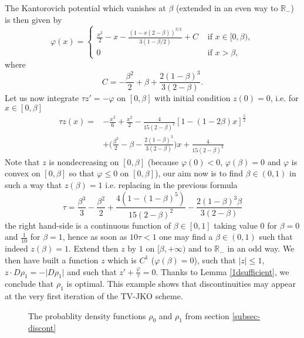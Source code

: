 \documentclass[12pt, a4paper]{article}
\numberwithin{equation}{section}
\theoremstyle{plain}
\theoremstyle{definition}
\theoremstyle{remark}
\newcommand{\R}{\mathbb{R}}
\begin{document}
The Kantorovich potential which vanishes at $\beta$ (extended in an even way to $\R_-$) is then given by
\[\varphi(x) = \begin{cases}
\frac{x^2}{2}- x -\frac{(1-x(2-\beta))^{3/2}}{3(1-\beta/2)} +C &\mbox{ if $x \in [0,\beta)$},\\
0 & \mbox{ if $x>\beta$},
\end{cases}\]
where
\[C = -\frac{\beta^2}{2} + \beta +\frac{2(1-\beta)^{3}}{3(2-\beta)}. \]
Let  us now integrate $\tau z'=-\varphi$ on $[0, \beta]$ with initial condition $z(0)=0$, i.e. for $x\in [0, \beta]$
\[\begin{split}
\tau z(x)=&-\frac{x^3}{6} +\frac{x^2}{2}-\frac{4}{15(2-\beta)^2} [1-(1-2\beta)x]^{\frac{5}{2}}\\
&+\Big(\frac{\beta^2}{2} - \beta -\frac{2(1-\beta)^{3}}{3(2-\beta)}\Big) x + \frac{4}{15(2-\beta)^2}
\end{split} \]
Note that $z$ is nondecreasing on $[0, \beta]$  (because  $\varphi(0)<0$, $\varphi(\beta)=0$ and $\varphi$ is convex on $[0, \beta]$ so that $\varphi\le 0$ on $[0, \beta]$), our aim now is to find $\beta\in (0,1)$ in such a way that $z(\beta)=1$ i.e. replacing in the previous formula 
\[\tau=\frac{\beta^3}{3} -\frac{\beta^2}{2}+ \frac{4(1-(1-\beta)^5)}{15(2-\beta)^2}-\frac{2(1-\beta)^3 \beta}{3(2-\beta)}\]
the right hand-side is a continuous function of $\beta\in [0,1]$ taking value $0$ for $\beta=0$ and $\frac{1}{10}$ for $\beta=1$, hence as soon as $10\tau <1$ one may find a $\beta\in (0,1)$ such that indeed $z(\beta)=1$. Extend then $z$ by $1$ on $[\beta, +\infty)$ and to $\R_-$ in an odd way. We then have built a function $z$ which is $C^1$ ($\varphi(\beta)=0$), such that $\vert z \vert \le 1$, $z\cdot D \rho_1=- \vert  D\rho_1 \vert$ and such that $z'+\frac{\varphi}{\tau}=0$. Thanks to Lemma \ref{1dsufficient}, we conclude that $\rho_1$ is optimal. This example shows that discontinuities may appear at the very first iteration of the TV-JKO scheme. 



\begin{figure}\label{hatrho}
\begin{center}
\end{center}
\caption{The probablity density functions $\rho_0$ and $\rho_1$ from section \ref{subsec-discont}}
\end{figure}
\end{document}
